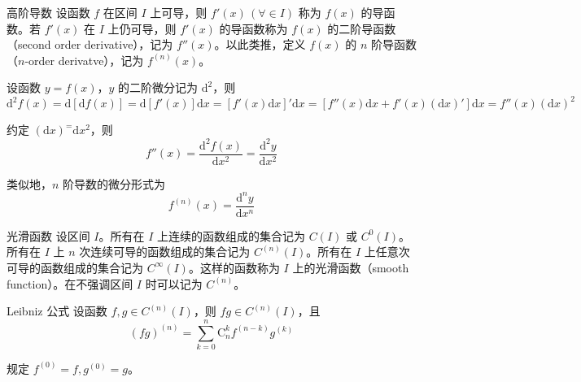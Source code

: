 \begin{definition}{高阶导数}
    设函数 $f$ 在区间 $I$ 上可导，则 $f'(x)\,(\forall \in I)$ 称为 $f(x)$ 的导函数。若 $f'(x)$ 在 $I$ 上仍可导，则 $f'(x)$ 的导函数称为 $f(x)$ 的二阶导函数（second order derivative），记为 $f''(x)$。以此类推，定义 $f(x)$ 的 $n$ 阶导函数（$n$-order derivatve），记为 $f^{(n)}(x)$。
\end{definition}

设函数 $y = f(x)$，$y$ 的二阶微分记为 $\mathrm{d}^2$，则
\[\mathrm{d}^2f(x) = \mathrm{d}[\mathrm{d}f(x)] = \mathrm{d}[f'(x)]\mathrm{d}x = [f'(x)\mathrm{d}x]'\mathrm{d}x = [f''(x)\mathrm{d}x + f'(x)(\mathrm{d}x)']\mathrm{d}x = f''(x)(\mathrm{d}x)^2\]

约定 $(\mathrm{d}x)^ = \mathrm{d}x^2$，则
\[f''(x) = \frac{\mathrm{d}^{2}f(x)}{\mathrm{d}x^2} = \frac{\mathrm{d}^{2}y}{\mathrm{d}x^2}\]

类似地，$n$ 阶导数的微分形式为
\[f^{(n)}(x) = \frac{\mathrm{d}^{n}y}{\mathrm{d}x^n}\]

\begin{definition}{光滑函数}
    设区间 $I$。所有在 $I$ 上连续的函数组成的集合记为 $C(I)$ 或 $C^0(I)$。所有在 $I$ 上 $n$ 次连续可导的函数组成的集合记为 $C^{(n)}(I)$。所有在 $I$ 上任意次可导的函数组成的集合记为 $C^\infty(I)$。这样的函数称为 $I$ 上的光滑函数（smooth function）。在不强调区间 $I$ 时可以记为 $C^{(n)}$。 
\end{definition}

\begin{theorem}{Leibniz 公式}
    设函数 $f, g \in C^{(n)}(I)$，则 $fg \in C^{(n)}(I)$，且
    \[(fg)^{(n)} = \sum_{k = 0}^{n} \mathrm{C}_{n}^{k}f^{(n - k)}g^{(k)} \]

    规定 $f^{(0)} = f, g^{(0)} = g$。
\end{theorem}

\section{}







\section{}







